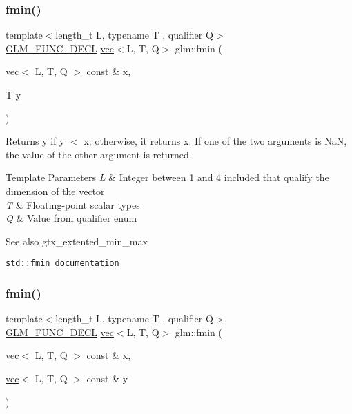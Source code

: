 \subsubsection{\texorpdfstring{fmin()}{fmin()}\hspace{0.1cm}{\footnotesize\ttfamily [2/3]}}
{\footnotesize\ttfamily template$<$length\+\_\+t L, typename T , qualifier Q$>$ \\
\mbox{\hyperlink{setup_8hpp_ab2d052de21a70539923e9bcbf6e83a51}{G\+L\+M\+\_\+\+F\+U\+N\+C\+\_\+\+D\+E\+CL}} \mbox{\hyperlink{structglm_1_1vec}{vec}}$<$L, T, Q$>$ glm\+::fmin (\begin{DoxyParamCaption}\item[{\mbox{\hyperlink{structglm_1_1vec}{vec}}$<$ L, T, Q $>$ const \&}]{x,  }\item[{T}]{y }\end{DoxyParamCaption})}

Returns y if y $<$ x; otherwise, it returns x. If one of the two arguments is NaN, the value of the other argument is returned.


\begin{DoxyTemplParams}{Template Parameters}
{\em L} & Integer between 1 and 4 included that qualify the dimension of the vector \\
\hline
{\em T} & Floating-\/point scalar types \\
\hline
{\em Q} & Value from qualifier enum\\
\hline
\end{DoxyTemplParams}
\begin{DoxySeeAlso}{See also}
gtx\+\_\+extented\+\_\+min\+\_\+max 

\href{http://en.cppreference.com/w/cpp/numeric/math/fmin}{\tt std\+::fmin documentation} 
\end{DoxySeeAlso}
\mbox{\label{group__gtx__extended__min__max_ga7c42e93cd778c9181d1cdeea4d3e43bd}} 
\subsubsection{\texorpdfstring{fmin()}{fmin()}\hspace{0.1cm}{\footnotesize\ttfamily [3/3]}}
{\footnotesize\ttfamily template$<$length\+\_\+t L, typename T , qualifier Q$>$ \\
\mbox{\hyperlink{setup_8hpp_ab2d052de21a70539923e9bcbf6e83a51}{G\+L\+M\+\_\+\+F\+U\+N\+C\+\_\+\+D\+E\+CL}} \mbox{\hyperlink{structglm_1_1vec}{vec}}$<$L, T, Q$>$ glm\+::fmin (\begin{DoxyParamCaption}\item[{\mbox{\hyperlink{structglm_1_1vec}{vec}}$<$ L, T, Q $>$ const \&}]{x,  }\item[{\mbox{\hyperlink{structglm_1_1vec}{vec}}$<$ L, T, Q $>$ const \&}]{y }\end{DoxyParamCaption})}

